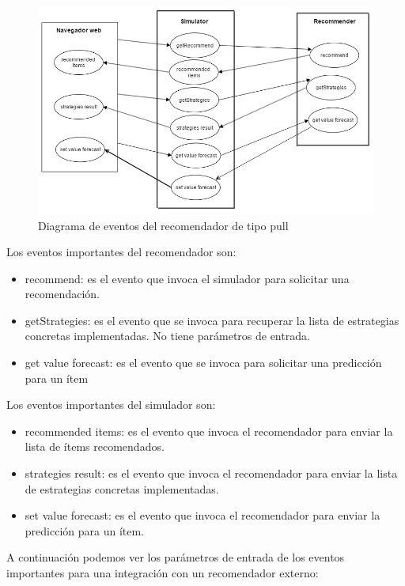 \begin{figure}[H]
	\centering\includegraphics[scale=0.5]{imagenes/diagrama-de-eventos.png}
	\caption{Diagrama de eventos del recomendador de tipo pull}
	\label{img:diagramaEventosPull}
\end{figure}

Los eventos importantes del recomendador son:

\begin{itemize}
	\item recommend: es el evento que invoca el simulador para solicitar una recomendación.
	\item getStrategies: es el evento que se invoca para recuperar la lista de estrategias concretas implementadas. No tiene parámetros de entrada.
	\item get value forecast: es el evento que se invoca para solicitar una predicción para un ítem
\end{itemize}

Los eventos importantes del simulador son:
\begin{itemize}
	\item recommended items: es el evento que invoca el recomendador para enviar la lista de ítems recomendados.
	\item strategies result: es el evento que invoca el recomendador para enviar la lista de estrategias concretas implementadas.
	\item set value forecast: es el evento que invoca el recomendador para enviar la predicción para un ítem.
\end{itemize}

A continuación podemos ver los parámetros de entrada de los eventos importantes para una integración con un recomendador externo:

